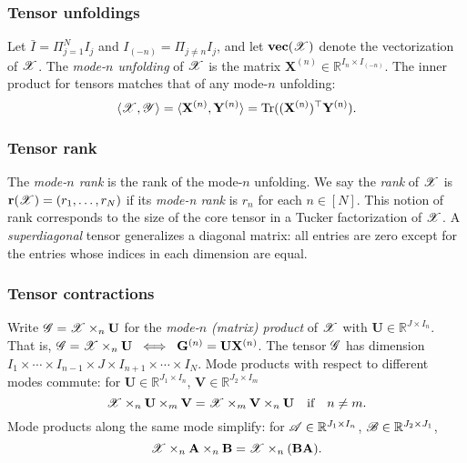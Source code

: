 \subsubsection{Tensor unfoldings}
Let $\bar{I} = \Pi_{j = 1}^N I_j $ and $I_{(-n)} = \Pi_{j \neq n} I_j $,
and let $\vc(\T{X})$ denote the vectorization of $\T{X}$.
The \textit{mode-$n$ unfolding} of $\T{X}$ is the matrix
$\mathbf{X}^{(n)} \in \mathbb{R}^{I_n \times I_{(-n)}}$.
The inner product for tensors matches that of any mode-$n$ unfolding:
\begin{equation}
\label{eq:F_norm_equivalent}
\langle \T{X}, \T{Y}\rangle = \langle \mathbf{X}^{(n)}, \mathbf{Y}^{(n)}\rangle = \rm{Tr}((\mathbf{X}^{(n)})^\top \mathbf{Y}^{(n)}).
\end{equation}

\subsubsection{Tensor rank}
The \textit{mode-$n$ rank} is the rank of the mode-$n$ unfolding.
We say the \textit{rank} of $\T{X}$ is
$\mathbf{r}(\T{X}) = (r_1,\dots, r_N)$ if its \textit{mode-n rank} is $r_n$ for each $n\in [N]$.
This notion of rank corresponds to the size of the core tensor in a Tucker factorization
of $\T{X}$.
A \emph{superdiagonal} tensor generalizes a diagonal matrix:
all entries are zero except for the entries
whose indices in each dimension are equal.

\subsubsection{Tensor contractions}
Write $\T{G} =\T{X} \times_n \mathbf{U}$ for the \textit{mode-$n$ (matrix) product}
of $\T{X}$ with $\mathbf{U} \in \mathbb{R}^{J \times I_n}$.
That is, $\T{G} =\T{X} \times_n \mathbf{U} \; \iff \; \mathbf{G}^{(n)} = \mathbf{U}\mathbf{X}^{(n)}$.
The tensor $\T{G}$ has dimension $I_1 \times \cdots \times I_{n-1} \times J \times I_{n+1} \times \cdots \times I_N$.
Mode products with respect to different modes commute:
for $\mathbf{U} \in \mathbb{R}^{J_1 \times I_n}$, $\mathbf{V} \in \mathbb{R}^{J_2 \times I_m}$
\[
\T{X} \times_n \mathbf{U} \times_m \mathbf{V} = \T{X} \times_m \mathbf{V} \times_n \mathbf{U}
\quad \text{if} \quad n \ne m.
\]
Mode products along the same mode simplify:
for $\T{A} \in \mathbb{R}^{J_1 \times I_n}$, $\T{B} \in \mathbb{R}^{J_2 \times J_1}$,
\[
\label{eq: tensor_product_association}
\T{X}\times_n \mathbf{A} \times_n \mathbf{B} = \T{X}\times_n (\mathbf{BA}).
\]

